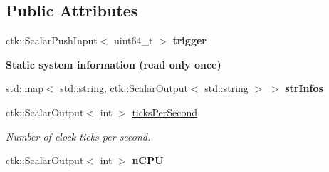 \subsection*{Public Attributes}
\begin{DoxyCompactItemize}
\item 
ctk\+::\+Scalar\+Push\+Input$<$ uint64\+\_\+t $>$ {\bfseries trigger}
\end{DoxyCompactItemize}
\begin{Indent}{\bf Static system information (read only once)}\par
\begin{DoxyCompactItemize}
\item 
std\+::map$<$ std\+::string, ctk\+::\+Scalar\+Output$<$ std\+::string $>$ $>$ {\bfseries str\+Infos}\hypertarget{classSystemInfoModule_ae52c7cda303fc72110074058c7b549b1}{}\label{classSystemInfoModule_ae52c7cda303fc72110074058c7b549b1}

\item 
ctk\+::\+Scalar\+Output$<$ int $>$ \hyperlink{classSystemInfoModule_abd71a50e108b76a81fb644ad745582c5}{ticks\+Per\+Second}
\begin{DoxyCompactList}\small\item\em Number of clock ticks per second. \end{DoxyCompactList}\item 
ctk\+::\+Scalar\+Output$<$ int $>$ {\bfseries n\+C\+PU}
\end{DoxyCompactItemize}
\end{Indent}
